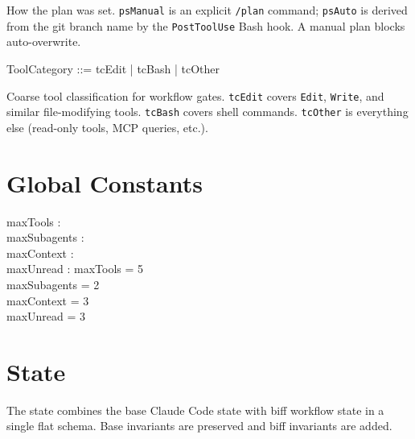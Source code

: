 \documentclass[a4paper,10pt,fleqn]{article}
\begin{document}
How the plan was set. \texttt{psManual} is an explicit \texttt{/plan}
command; \texttt{psAuto} is derived from the git branch name by the
\texttt{PostToolUse} Bash hook. A manual plan blocks auto-overwrite.

\begin{zed}
  ToolCategory ::= tcEdit | tcBash | tcOther
\end{zed}

Coarse tool classification for workflow gates. \texttt{tcEdit} covers
\texttt{Edit}, \texttt{Write}, and similar file-modifying tools.
\texttt{tcBash} covers shell commands. \texttt{tcOther} is everything
else (read-only tools, MCP queries, etc.).

\section{Global Constants}

\begin{axdef}
  maxTools : \nat \\
  maxSubagents : \nat \\
  maxContext : \nat \\
  maxUnread : \nat
  \where
  maxTools = 5 \\
  maxSubagents = 2 \\
  maxContext = 3 \\
  maxUnread = 3
\end{axdef}

\section{State}

The state combines the base Claude Code state with biff workflow
state in a single flat schema. Base invariants are preserved and
biff invariants are added.
\end{document}
